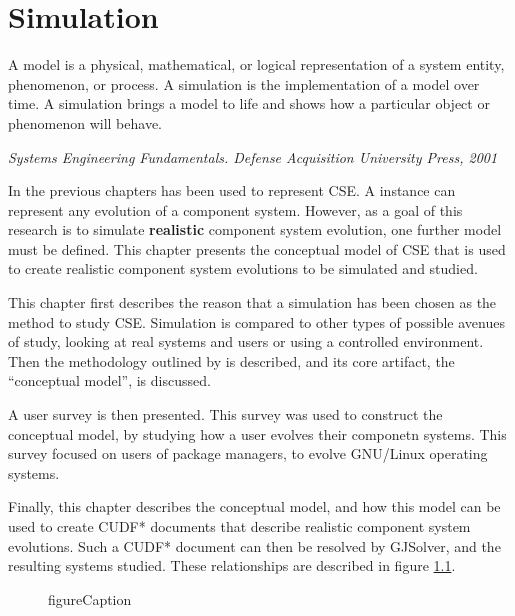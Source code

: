\chapter{Simulation}
\label{simulation}
\epigraph{A model is a physical, mathematical, or logical representation of a system entity, phenomenon, or process. 
A simulation is the implementation of a model over time. 
A simulation brings a model to life and shows how a particular object or phenomenon will behave.}
{\textit{Systems Engineering Fundamentals. Defense Acquisition University Press, 2001}}

In the previous chapters \modelname has been used to represent CSE.
A \modelname instance can represent any evolution of a component system.
However, as a goal of this research is to simulate \textbf{realistic} component system evolution, one further model must be defined.
This chapter presents the conceptual model of CSE that is used to create realistic component system evolutions to be simulated and studied.

This chapter first describes the reason that a simulation has been chosen as the method to study CSE.
Simulation is compared to other types of possible avenues of study, looking at real systems and users or using a controlled environment.
Then the methodology outlined by \cite{Law2005} is described, 
and its core artifact, the ``conceptual model'', is discussed.

A user survey is then presented.
This survey was used to construct the conceptual model, by studying how a user evolves their componetn systems.
This survey focused on users of package managers, to evolve GNU/Linux operating systems.

Finally, this chapter describes the conceptual model, and how this model can be used to create CUDF* documents that describe realistic component system evolutions. 
Such a CUDF* document can then be resolved by GJSolver, and the resulting systems studied.
These relationships are described in figure \ref{sim.modeldiagram}.

\begin{figure}[htp]
\begin{center}
  \caption[labelInTOC]{figureCaption}
  \label{sim.modeldiagram}
\end{center}
\end{figure}

